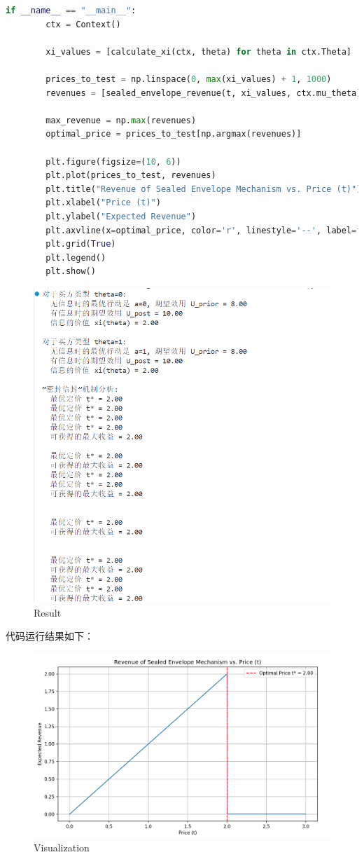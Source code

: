 \begin{lstlisting}[language=Python,style=pythonstyle]
    if __name__ == "__main__":
        ctx = Context()
        
        xi_values = [calculate_xi(ctx, theta) for theta in ctx.Theta]
        
        prices_to_test = np.linspace(0, max(xi_values) + 1, 1000)
        revenues = [sealed_envelope_revenue(t, xi_values, ctx.mu_theta) for t in prices_to_test]
        
        max_revenue = np.max(revenues)
        optimal_price = prices_to_test[np.argmax(revenues)]
    
        plt.figure(figsize=(10, 6))
        plt.plot(prices_to_test, revenues)
        plt.title("Revenue of Sealed Envelope Mechanism vs. Price (t)")
        plt.xlabel("Price (t)")
        plt.ylabel("Expected Revenue")
        plt.axvline(x=optimal_price, color='r', linestyle='--', label=f'Optimal Price t* = {optimal_price:.2f}')
        plt.grid(True)
        plt.legend()
        plt.show()    
\end{lstlisting}

\begin{figure}[H]
    \centering
    \includegraphics[width=0.6\linewidth]{image15.png}
    \caption{Result}
    \label{}
\end{figure}

代码运行结果如下：
\begin{figure}[H]
    \centering
    \includegraphics[width=0.5\linewidth]{image14.png}
    \caption{Visualization}
    \label{}
\end{figure}

